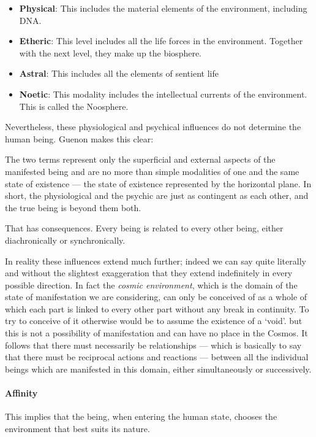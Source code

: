 \begin{itemize}
\item \textbf{Physical}: This includes the material elements of the environment, including DNA. 
\item \textbf{Etheric}: This level includes all the life forces in the environment. Together with the next level, they make up the biosphere. 
\item \textbf{Astral}: This includes all the elements of sentient life 
\item \textbf{Noetic}: This modality includes the intellectual currents of the environment. This is called the Noosphere. 
\end{itemize}
Nevertheless, these physiological and psychical influences do not determine the human being. Guenon makes this clear:

\begin{quotex}
The two terms represent only the superficial and external aspects of the manifested being and are no more than simple modalities of one and the same state of existence — the state of existence represented by the horizontal plane. In short, the physiological and the psychic are just as contingent as each other, and the true being is beyond them both. 

\end{quotex}
That has consequences. Every being is related to every other being, either diachronically or synchronically.

\begin{quotex}
In reality these influences extend much further; indeed we can say quite literally and without the slightest exaggeration that they extend indefinitely in every possible direction. In fact the \emph{cosmic environment}, which is the domain of the state of manifestation we are considering, can only be conceived of as a whole of which each part is linked to every other part without any break in continuity. To try to conceive of it otherwise would be to assume the existence of a `void'. but this is not a possibility of manifestation and can have no place in the Cosmos. It follows that there must necessarily be relationships — which is basically to say that there must be reciprocal actions and reactions — between all the individual beings which are manifested in this domain, either simultaneously or successively. 

\end{quotex}
\paragraph{Affinity}
This implies that the being, when entering the human state, chooses the environment that best suits its nature.

